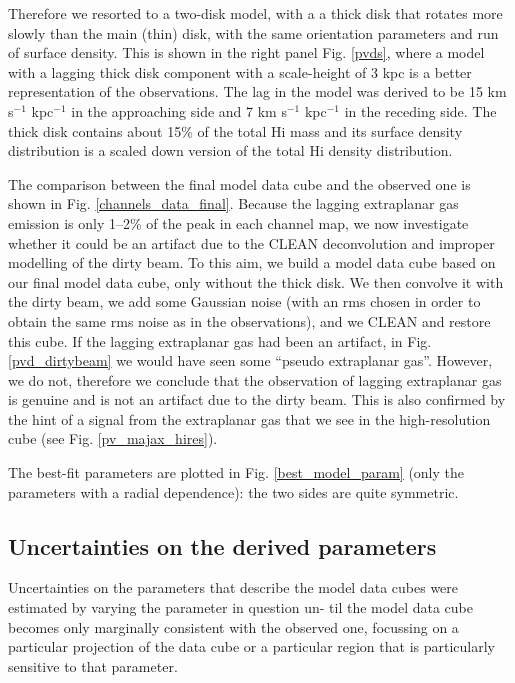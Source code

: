 \documentclass[traditabstract]{aa}
\begin{document}
Therefore we resorted to a two-disk model, with a a thick disk that
rotates more slowly than the main (thin) disk, with the same
orientation parameters and run of surface density. This is shown in
the right panel Fig. \ref{pvds}, where a model with a lagging thick disk
component with a scale-height of 3 kpc is a better representation of
the observations. The lag in the model was derived to be 15 km s$^{-1}$
kpc$^{-1}$ in the approaching side and 7 km s$^{-1}$ kpc$^{-1}$ in the receding
side. The thick disk contains about 15\% of the total H{\sc i} mass
and its surface density distribution is a scaled down version of
  the total H{\sc i} density distribution. 

The comparison between the final model data cube and the observed one
is shown in Fig. \ref{channels_data_final}. Because the lagging extraplanar gas emission is
only 1--2\% of the peak in each channel map, we now investigate whether
it could be an artifact due to the CLEAN deconvolution and improper
modelling of the dirty beam. To this aim, we build a model data cube
based on our final model data cube, only without the thick disk. We
then convolve it with the dirty beam, we add some Gaussian noise (with
an rms chosen in order to obtain the same rms noise as in the
observations), and we CLEAN and restore this cube. If the lagging
extraplanar gas had been an artifact, in Fig. \ref{pvd_dirtybeam} we would have seen
some ``pseudo extraplanar gas''. However, we do not, therefore we
conclude that the observation of lagging extraplanar gas is genuine
and is not an artifact due to the dirty beam. This is also confirmed
by the hint of a signal from the extraplanar gas that we see in the
high-resolution cube (see Fig. \ref{pv_majax_hires}). 

The best-fit parameters are plotted in Fig. \ref{best_model_param}
(only the parameters with a radial dependence):
the two sides are quite symmetric.


\subsection{Uncertainties on the derived parameters}
\label{sect_uncertainties}

Uncertainties on the parameters that describe the model data cubes
were estimated by varying the parameter in question un- til the model
data cube becomes only marginally consistent with the observed one,
focussing on a particular projection of the data cube or a particular
region that is particularly sensitive to that parameter. 
\end{document}
